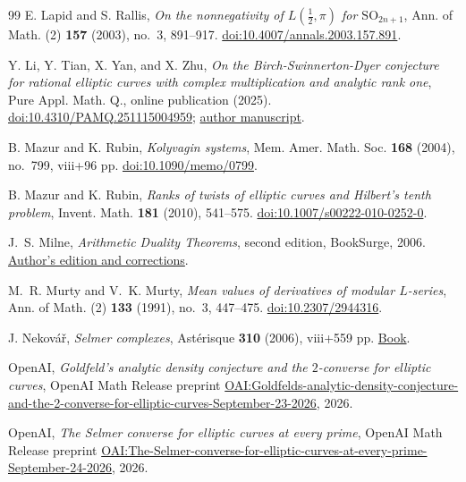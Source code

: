 \begin{thebibliography}{99}
E. Lapid and S. Rallis,
\emph{On the nonnegativity of $L(\tfrac12,\pi)$ for $\mathrm{SO}_{2n+1}$},
Ann. of Math. (2) \textbf{157} (2003), no.~3, 891--917.
\href{https://doi.org/10.4007/annals.2003.157.891}{doi:10.4007/annals.2003.157.891}.

Y. Li, Y. Tian, X. Yan, and X. Zhu,
\emph{On the Birch-Swinnerton-Dyer conjecture for rational elliptic curves with complex multiplication and analytic rank one},
Pure Appl. Math. Q., online publication (2025).
\href{https://doi.org/10.4310/PAMQ.251115004959}{doi:10.4310/PAMQ.251115004959};
\href{https://xiuwuzhu.com/pub/cmbsd.pdf}{author manuscript}.

B. Mazur and K. Rubin,
\emph{Kolyvagin systems},
Mem. Amer. Math. Soc. \textbf{168} (2004), no.~799, viii+96 pp.
\href{https://doi.org/10.1090/memo/0799}{doi:10.1090/memo/0799}.

B. Mazur and K. Rubin,
\emph{Ranks of twists of elliptic curves and Hilbert's tenth problem},
Invent. Math. \textbf{181} (2010), 541--575.
\href{https://doi.org/10.1007/s00222-010-0252-0}{doi:10.1007/s00222-010-0252-0}.

J.~S. Milne,
\emph{Arithmetic Duality Theorems}, second edition,
BookSurge, 2006.
\href{https://www.jmilne.org/math/Books/adt.html}{Author's edition and corrections}.

M.~R. Murty and V.~K. Murty,
\emph{Mean values of derivatives of modular $L$-series},
Ann. of Math. (2) \textbf{133} (1991), no.~3, 447--475.
\href{https://doi.org/10.2307/2944316}{doi:10.2307/2944316}.

J. Nekov\'a\v{r},
\emph{Selmer complexes},
Ast\'erisque \textbf{310} (2006), viii+559 pp.
\href{https://www.numdam.org/item/AST_2006__310__R1_0/}{Book}.

OpenAI,
\emph{Goldfeld's analytic density conjecture and the $2$-converse for elliptic curves},
OpenAI Math Release preprint
\href{https://github.com/openai/math/blob/main/preprints/Goldfelds-analytic-density-conjecture-and-the-2-converse-for-elliptic-curves-September-23-2026/paper.pdf}{OAI:Goldfelds-analytic-density-conjecture-and-the-2-converse-for-elliptic-curves-September-23-2026},
2026.

OpenAI,
\emph{The Selmer converse for elliptic curves at every prime},
OpenAI Math Release preprint
\href{https://github.com/openai/math/blob/main/preprints/The-Selmer-converse-for-elliptic-curves-at-every-prime-September-24-2026/main.pdf}{OAI:The-Selmer-converse-for-elliptic-curves-at-every-prime-September-24-2026},
2026.


\end{thebibliography}
